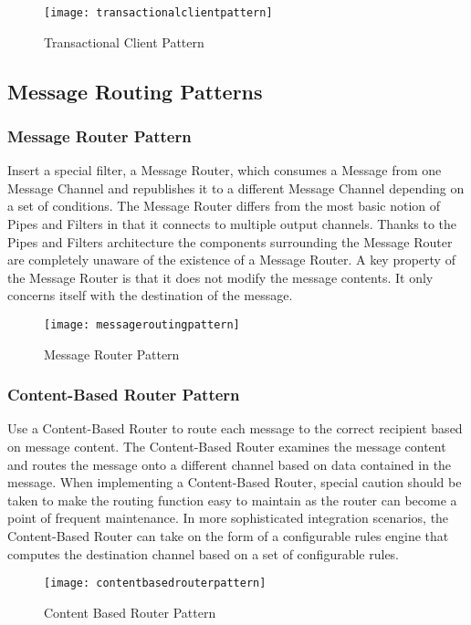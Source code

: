 \begin{figure}[H]
  \center
  \texttt{[image: transactionalclientpattern]}
  \caption{Transactional Client Pattern}
\end{figure}

\pagebreak

\subsection{Message Routing Patterns}

\subsubsection{Message Router Pattern}
Insert a special filter, a Message Router, which consumes a Message from one Message Channel and republishes it to a different Message Channel depending on a set of conditions. The Message Router differs from the most basic notion of Pipes and Filters in that it connects to multiple output channels. Thanks to the Pipes and Filters architecture the components surrounding the Message Router are completely unaware of the existence of a Message Router. A key property of the Message Router is that it does not modify the message contents. It only concerns itself with the destination of the message.

\begin{figure}[H]
  \center
  \texttt{[image: messageroutingpattern]}
  \caption{Message Router Pattern}
\end{figure}

\subsubsection{Content-Based Router Pattern}
Use a Content-Based Router to route each message to the correct recipient based on message content. The Content-Based Router examines the message content and routes the message onto a different channel based on data contained in the message. When implementing a Content-Based Router, special caution should be taken to make the routing function easy to maintain as the router can become a point of frequent maintenance. In more sophisticated integration scenarios, the Content-Based Router can take on the form of a configurable rules engine that computes the destination channel based on a set of configurable rules.

\begin{figure}[H]
  \center
  \texttt{[image: contentbasedrouterpattern]}
  \caption{Content Based Router Pattern}
\end{figure}

